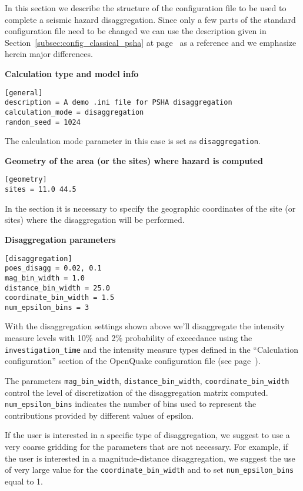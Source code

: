 In this section we describe the structure of the configuration file to be used
to complete a seismic hazard disaggregation. Since only a few parts of the
standard configuration file need to be changed we can use the description
given in Section~\ref{subsec:config_classical_psha} at
page~\pageref{subsec:config_classical_psha} as a reference and we emphasize
herein major differences.


\textbf{Calculation type and model info}
\begin{Verbatim}[frame=single, commandchars=\\\{\}, fontsize=\small]
[general]
description = A demo .ini file for PSHA disaggregation
calculation_mode = disaggregation
random_seed = 1024
\end{Verbatim}

The calculation mode parameter in this case is set as
\texttt{disaggregation}.



\textbf{Geometry of the area (or the sites) where hazard is computed}

\begin{Verbatim}[frame=single, commandchars=\\\{\}, fontsize=\small]
[geometry]
sites = 11.0 44.5
\end{Verbatim}

In the section it is necessary to specify the geographic coordinates of
the site (or sites) where the disaggregation will be performed.



\textbf{Disaggregation parameters}

\begin{Verbatim}[frame=single, commandchars=\\\{\}, fontsize=\small]
[disaggregation]
poes_disagg = 0.02, 0.1
mag_bin_width = 1.0
distance_bin_width = 25.0
coordinate_bin_width = 1.5
num_epsilon_bins = 3
\end{Verbatim}

With the disaggregation settings shown above we'll disaggregate the intensity
measure levels with 10\% and 2\% probability of exceedance using the
\texttt{in\-ves\-ti\-gation\_time} and the intensity measure types  defined in
the ``Calculation configuration'' section of the OpenQuake configuration file
(see page~\pageref{sec:calculation_configuration}).

The parameters \texttt{mag\_bin\_width},  \texttt{distance\_bin\_width},
\texttt{coordinate\_bin\_width} control the level of discretization of the
disaggregation matrix computed. \texttt{num\_epsilon\_bins} indicates the
number of bins used to represent the contributions provided by different
values of epsilon.

If the user is interested in a specific type of disaggregation, we suggest to
use a very coarse gridding for the parameters that are  not necessary. For
example, if the user is interested in a magnitude-distance  disaggregation, we
suggest the use of very large value for the
\texttt{coordinate\_\-bin\_\-width} and to set  \texttt{num\_epsilon\_bins}
equal to 1.
